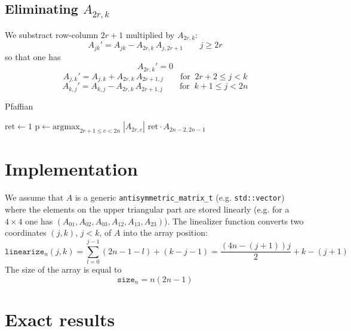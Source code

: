 \documentclass{article}
\begin{document}
\subsection{Eliminating $A_{2r, k}$}
We substract row-column $2r+1$ multiplied by $A_{2r,k}$:
$$
A_{jk}' = A_{jk} -A_{2r, k}\, A_{j,2r+1} \qquad j\ge 2r
$$
so that one has
$$
A_{2r,k}' = 0
$$
$$
A_{j,k}' = A_{j,k} +A_{2r, k}\, A_{2r+1,j} \qquad \text{for}\;\; 2r+2\le j<k
$$
$$
A_{k,j}' = A_{k,j} -A_{2r, k}\, A_{2r+1,j} \qquad \text{for}\;\; k+1\le j<2n
$$
\begin{algorithm}
  \caption{Pfaffian}
\begin{algorithmic}[1]
  \State $\text{ret}\gets 1$
  \EndIf
  \State $\text{p}\gets \text{argmax}_{2r+1\le c < 2n}\;|A_{2r,c}|$
  \EndFor
  \EndFor
  \EndIf
  \EndFor
  \EndFor
  \EndFor
  \EndFor
  \State \Return $\text{ret} \cdot A_{2n-2,2n-1}$
\end{algorithmic}
\end{algorithm}
\section{Implementation}
We assume that $A$ is a generic \texttt{antisymmetric\_matrix\_t} (e.g. \texttt{std::vector}) where the elements on the upper triangular part are stored linearly (e.g. for a $4\times 4$ one has $(A_{01}, A_{02}, A_{03}, A_{12}, A_{13}, A_{23})$). The linealizer function converts two coordinates $(j,k)$, $j<k$, of $A$ into the array position:
$$
\texttt{linearize}_n(j,k)=\sum_{l=0}^{j-1}\left(2n-1-l\right) +(k-j-1)=\frac{(4n-(j+1))j}{2} + k -(j+1)
$$
The size of the array is equal to
$$
\texttt{size}_n = n(2n-1)
$$
\section{Exact results}
\end{document}

